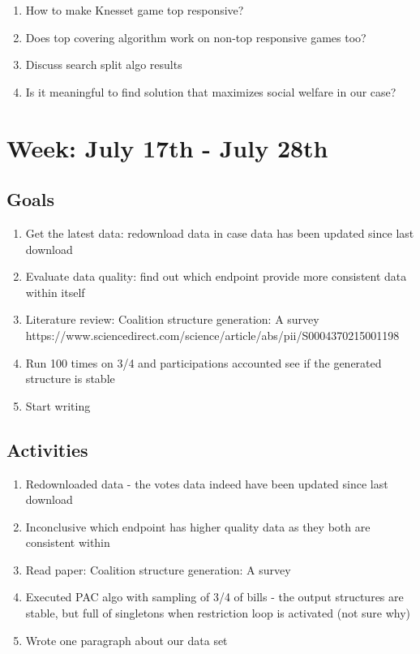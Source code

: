 \documentclass[a4paper]{article}
\begin{document}
\begin{enumerate}
  \item How to make Knesset game top responsive?
  \item Does top covering algorithm work on non-top responsive games too?
  \item Discuss search split algo results
  \item Is it meaningful to find solution that maximizes social welfare in our case?
\end{enumerate}

\section*{Week: July 17th - July 28th}

\subsection*{Goals}

\begin{enumerate}
  \item Get the latest data: redownload data in case data has been updated since last download
  \item Evaluate data quality: find out which endpoint provide more consistent data within itself
  \item Literature review: Coalition structure generation: A survey https://www.sciencedirect.com/science/article/abs/pii/S0004370215001198
  \item Run 100 times on 3/4 and participations accounted see if the generated structure is stable
  \item Start writing
\end{enumerate}

\subsection*{Activities}

\begin{enumerate}
  \item Redownloaded data - the votes data indeed have been updated since last download
  \item Inconclusive which endpoint has higher quality data as they both are consistent within
  \item Read paper: Coalition structure generation: A survey
  \item Executed PAC algo with sampling of 3/4 of bills - the output structures are stable, but full of singletons when restriction loop is activated (not sure why)
  \item Wrote one paragraph about our data set
\end{enumerate}
\end{document}
